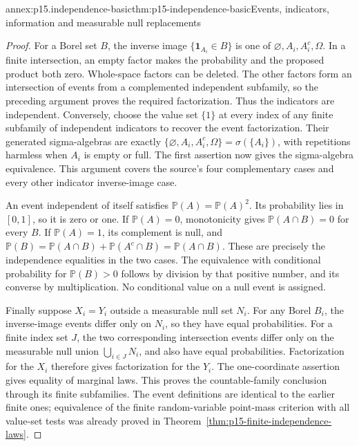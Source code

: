 \begin{annexitem}{annex:p15.independence-basic}{thm:p15-independence-basic}{Events, indicators, information and measurable null replacements}
\begin{proof}
For a Borel set \(B\), the inverse image
\(\{\mathbf1_{A_i}\in B\}\) is one of
\(\varnothing,A_i,A_i^c,\Omega\). In a finite intersection, an
empty factor makes the probability and the proposed product both zero.
Whole-space factors can be deleted. The other factors form an
intersection of events from a complemented independent subfamily, so
the preceding argument proves the required factorization. Thus the
indicators are independent. Conversely, choose the value set \(\{1\}\)
at every index of any finite subfamily of independent indicators to
recover the event factorization. Their generated sigma-algebras are
exactly \(\{\varnothing,A_i,A_i^c,\Omega\}=\sigma(\{A_i\})\),
with repetitions harmless when \(A_i\) is empty or full. The first
assertion now gives the sigma-algebra equivalence. This argument covers
the source's four complementary cases and every other indicator
inverse-image case.

An event independent of itself satisfies
\(\mathbb P(A)=\mathbb P(A)^2\). Its probability lies in
\([0,1]\), so it is zero or one. If \(\mathbb P(A)=0\),
monotonicity gives \(\mathbb P(A\cap B)=0\) for every \(B\).
If \(\mathbb P(A)=1\), its complement is null, and
\(\mathbb P(B)=\mathbb P(A\cap B)+\mathbb P(A^c\cap B)
=\mathbb P(A\cap B)\). These are precisely the independence
equalities in the two cases. The equivalence with conditional
probability for \(\mathbb P(B)>0\) follows by division by that
positive number, and its converse by multiplication. No conditional
value on a null event is assigned.

Finally suppose \(X_i=Y_i\) outside a measurable null set \(N_i\).
For any Borel \(B_i\), the inverse-image events differ only on
\(N_i\), so they have equal probabilities. For a finite index
set \(J\), the two corresponding intersection events differ only
on the measurable null union \(\bigcup_{i\in J}N_i\), and also
have equal probabilities. Factorization for the \(X_i\) therefore
gives factorization for the \(Y_i\). The one-coordinate assertion
gives equality of marginal laws. This proves the countable-family
conclusion through its finite subfamilies. The event definitions
are identical to the earlier finite ones; equivalence of the finite
random-variable point-mass criterion with all value-set tests was
already proved in Theorem~\ref{thm:p15-finite-independence-laws}.
\end{proof}
\end{annexitem}

